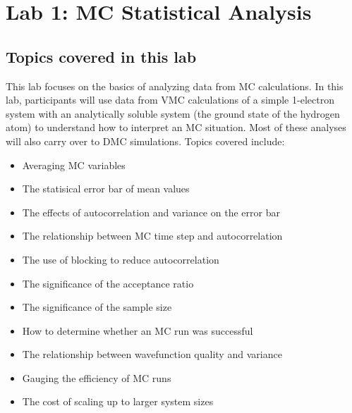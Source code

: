 
\chapter{Lab 1: MC Statistical Analysis}
\label{chap:lab_qmc_statistics}


\section{Topics covered in this lab} 

This lab focuses on the basics of analyzing data from MC
calculations.  In this lab, participants will use data from
VMC calculations of a simple 1-electron system with an analytically soluble
system (the ground state of the hydrogen atom) to understand how to interpret an
MC situation.  Most of these analyses will also carry over to DMC simulations.  Topics covered include:
\begin{itemize}
  \item{Averaging MC variables}
  \item{The statisical error bar of mean values}
  \item{The effects of autocorrelation and variance on the error bar}
  \item{The relationship between MC time step and autocorrelation}
  \item{The use of blocking to reduce autocorrelation}
  \item{The significance of the acceptance ratio}
  \item{The significance of the sample size}
  \item{How to determine whether an MC run was successful}
  \item{The relationship between wavefunction quality and variance}
  \item{Gauging the efficiency of MC runs}
  \item{The cost of scaling up to larger system sizes}
\end{itemize}



